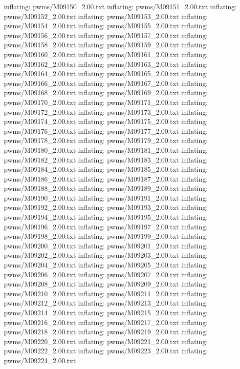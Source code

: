 \documentclass[letterpaper,10pt,english]{sphinxmanual}
\begin{document}
{\begin{sphinxVerbatim}[commandchars=\\\{\}]
  inflating: pwms/M09150\_2.00.txt
  inflating: pwms/M09151\_2.00.txt
  inflating: pwms/M09152\_2.00.txt
  inflating: pwms/M09153\_2.00.txt
  inflating: pwms/M09154\_2.00.txt
  inflating: pwms/M09155\_2.00.txt
  inflating: pwms/M09156\_2.00.txt
  inflating: pwms/M09157\_2.00.txt
  inflating: pwms/M09158\_2.00.txt
  inflating: pwms/M09159\_2.00.txt
  inflating: pwms/M09160\_2.00.txt
  inflating: pwms/M09161\_2.00.txt
  inflating: pwms/M09162\_2.00.txt
  inflating: pwms/M09163\_2.00.txt
  inflating: pwms/M09164\_2.00.txt
  inflating: pwms/M09165\_2.00.txt
  inflating: pwms/M09166\_2.00.txt
  inflating: pwms/M09167\_2.00.txt
  inflating: pwms/M09168\_2.00.txt
  inflating: pwms/M09169\_2.00.txt
  inflating: pwms/M09170\_2.00.txt
  inflating: pwms/M09171\_2.00.txt
  inflating: pwms/M09172\_2.00.txt
  inflating: pwms/M09173\_2.00.txt
  inflating: pwms/M09174\_2.00.txt
  inflating: pwms/M09175\_2.00.txt
  inflating: pwms/M09176\_2.00.txt
  inflating: pwms/M09177\_2.00.txt
  inflating: pwms/M09178\_2.00.txt
  inflating: pwms/M09179\_2.00.txt
  inflating: pwms/M09180\_2.00.txt
  inflating: pwms/M09181\_2.00.txt
  inflating: pwms/M09182\_2.00.txt
  inflating: pwms/M09183\_2.00.txt
  inflating: pwms/M09184\_2.00.txt
  inflating: pwms/M09185\_2.00.txt
  inflating: pwms/M09186\_2.00.txt
  inflating: pwms/M09187\_2.00.txt
  inflating: pwms/M09188\_2.00.txt
  inflating: pwms/M09189\_2.00.txt
  inflating: pwms/M09190\_2.00.txt
  inflating: pwms/M09191\_2.00.txt
  inflating: pwms/M09192\_2.00.txt
  inflating: pwms/M09193\_2.00.txt
  inflating: pwms/M09194\_2.00.txt
  inflating: pwms/M09195\_2.00.txt
  inflating: pwms/M09196\_2.00.txt
  inflating: pwms/M09197\_2.00.txt
  inflating: pwms/M09198\_2.00.txt
  inflating: pwms/M09199\_2.00.txt
  inflating: pwms/M09200\_2.00.txt
  inflating: pwms/M09201\_2.00.txt
  inflating: pwms/M09202\_2.00.txt
  inflating: pwms/M09203\_2.00.txt
  inflating: pwms/M09204\_2.00.txt
  inflating: pwms/M09205\_2.00.txt
  inflating: pwms/M09206\_2.00.txt
  inflating: pwms/M09207\_2.00.txt
  inflating: pwms/M09208\_2.00.txt
  inflating: pwms/M09209\_2.00.txt
  inflating: pwms/M09210\_2.00.txt
  inflating: pwms/M09211\_2.00.txt
  inflating: pwms/M09212\_2.00.txt
  inflating: pwms/M09213\_2.00.txt
  inflating: pwms/M09214\_2.00.txt
  inflating: pwms/M09215\_2.00.txt
  inflating: pwms/M09216\_2.00.txt
  inflating: pwms/M09217\_2.00.txt
  inflating: pwms/M09218\_2.00.txt
  inflating: pwms/M09219\_2.00.txt
  inflating: pwms/M09220\_2.00.txt
  inflating: pwms/M09221\_2.00.txt
  inflating: pwms/M09222\_2.00.txt
  inflating: pwms/M09223\_2.00.txt
  inflating: pwms/M09224\_2.00.txt

\end{sphinxVerbatim}}
\end{document}
